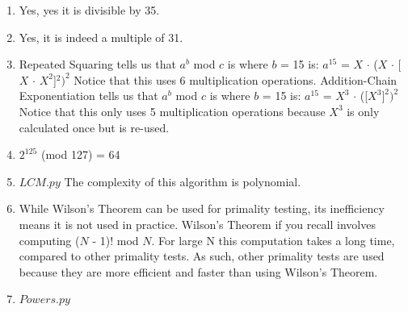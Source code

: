 \documentclass[12pt,letterpaper]{article}
\begin{document}
\begin{enumerate}
        \item
            Yes, yes it is divisible by 35.
        \item
            Yes, it is indeed a multiple of 31.
        \item
        	Repeated Squaring tells us that $a^{b}$ mod $c$ is where $b$ = 15 is:
            \newline
            $a^{15}$ = $X$ $\cdot$ ($X$ $\cdot$ [$X$ \(\cdot\) \(X^2\)]$^2$\()^2\)
            \newline
            Notice that this uses 6 multiplication operations. Addition-Chain Exponentiation tells us that $a^{b}$ mod $c$ is where $b$ = 15 is:
            \newline
            $a^{15}$ = $X^3$ $\cdot$ ([$X^3$\(]^2\)$)^2$
            \newline
            Notice that this only uses 5 multiplication operations because $X^3$ is only calculated once but is re-used.
        \item
        	$2^{125}$ (mod 127) = 64
        \item
        	$LCM.py$  The complexity of this algorithm is polynomial.
        \item
        	While Wilson's Theorem can be used for primality testing, its inefficiency means it is not used in practice. Wilson's Theorem if you recall involves computing ($N$ - 1)! mod $N$. For large N this computation takes a long time, compared to other primality tests. As such, other primality tests are used because they are more efficient and faster than using Wilson's Theorem.
        \item
        	$Powers.py$ 
    \end{enumerate}
    
\end{document}
